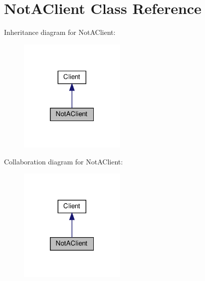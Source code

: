 \hypertarget{class_not_a_client}{}\section{Not\+A\+Client Class Reference}
\label{class_not_a_client}


Inheritance diagram for Not\+A\+Client\+:\nopagebreak
\begin{figure}[H]
\begin{center}
\leavevmode
\includegraphics[width=145pt]{class_not_a_client__inherit__graph}
\end{center}
\end{figure}


Collaboration diagram for Not\+A\+Client\+:\nopagebreak
\begin{figure}[H]
\begin{center}
\leavevmode
\includegraphics[width=145pt]{class_not_a_client__coll__graph}
\end{center}
\end{figure}
